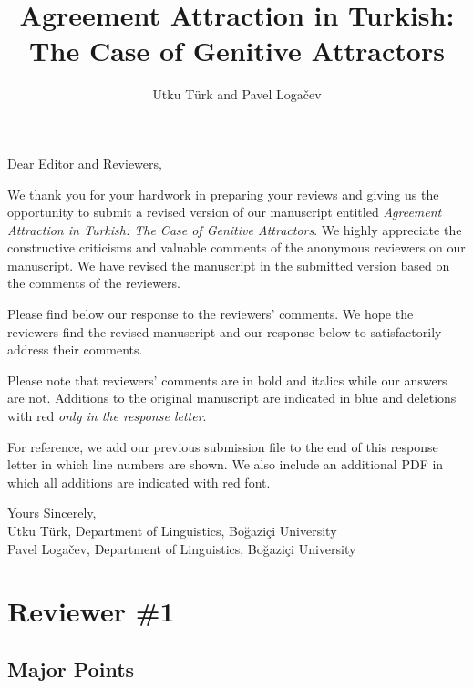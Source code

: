 \documentclass{ar2rc}
\title{Agreement Attraction in Turkish:\\ The Case of Genitive Attractors}
\author{Utku T\"urk and Pavel Loga\v{c}ev}
\begin{document}
\maketitle

Dear Editor and Reviewers, 

We thank you for your hardwork in preparing your reviews 
and giving us the opportunity to submit a revised version of our manuscript entitled \emph{Agreement Attraction in Turkish: The Case of Genitive Attractors}. We highly appreciate the constructive criticisms and valuable comments of the anonymous reviewers on our manuscript. We have revised the manuscript in the submitted version based on the comments of the reviewers.   

Please find below our response to the reviewers' comments. We hope the reviewers find the revised manuscript and our response below to satisfactorily address their comments. 

Please note that reviewers' comments are in bold and italics while our
answers are not. Additions to the original manuscript are indicated in blue and deletions with red \emph{only in the response letter}. 

For reference, we add our previous submission file to the end of this response letter in which line numbers are shown. We also include an additional PDF in which all additions are indicated with red font.

Yours Sincerely,\\
Utku T\"urk, Department of Linguistics, Boğaziçi University\\
Pavel Loga\v{c}ev, Department of Linguistics, Boğaziçi University\\



\section{Reviewer \#1}

\subsection{Major Points}
\end{document}
